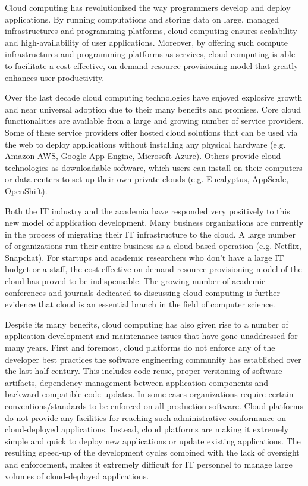 Cloud computing has revolutionized the way programmers develop and deploy applications.
By running computations and storing data on large, managed infrastructures and 
programming platforms, cloud computing ensures scalability and high-availability of 
user applications. Moreover, by offering such compute infrastructures and programming 
platforms as services, cloud computing is able to facilitate a cost-effective, on-demand
resource provisioning model that greatly enhances user productivity.

Over the last decade cloud computing technologies have enjoyed explosive growth 
and near universal adoption due to their many benefits and promises. Core cloud 
functionalities are available from a large and growing number of service providers. 
Some of these service providers offer hosted cloud solutions that can be used
via the web to deploy applications without installing any physical hardware 
(e.g. Amazon AWS, Google App Engine, Microsoft Azure). Others
provide cloud technologies as downloadable software, which users can install
on their computers or data centers to set up their own private clouds 
(e.g. Eucalyptus, AppScale, OpenShift). 

Both the IT industry and the academia have responded very positively to this new 
model of application 
development. Many business organizations are currently in the process of migrating
their IT infrastructure to the cloud. A large number of organizations
run their entire business as a cloud-based operation (e.g. Netflix, Snapchat). For startups
and academic researchers who don't have a large IT budget or a staff, the cost-effective 
on-demand resource provisioning model of the cloud has proved to be indispensable.
The growing number of academic conferences and journals dedicated to discussing
cloud computing is further evidence that cloud is an essential branch in the field
of computer science.

Despite its many benefits, cloud computing has also given rise to a number of application
development and maintenance issues that have gone unaddressed for many years. 
First and foremost, cloud platforms do not enforce any of the developer best practices
the software engineering community has established over the last half-century. This
includes code reuse, proper versioning of software artifacts, dependency management
between application components and backward compatible code updates. In
some cases organizations require certain conventions/standards to be enforced on
all production software. Cloud platforms do not provide any facilities for reaching
such administrative conformance on cloud-deployed applications. Instead, cloud platforms
are making it extremely simple and quick to deploy new applications or update existing
applications. The resulting speed-up of the development cycles combined with the lack of 
oversight and enforcement, makes it extremely difficult for 
IT personnel to manage large volumes of cloud-deployed applications.

